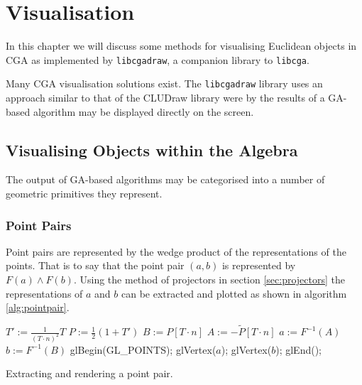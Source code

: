 \begin{savequote}
\end{savequote}

\chapter{Visualisation}

In this chapter we will discuss some methods for visualising Euclidean objects
in CGA as implemented by {\tt libcgadraw}, a companion library to {\tt libcga}.

Many CGA visualisation solutions exist\cite{CLU}. The {\tt libcgadraw} library
uses an approach similar to that of the CLUDraw library were by the results of 
a GA-based algorithm may be displayed directly on the screen.

\section{Visualising Objects within the Algebra}

The output of GA-based algorithms may be categorised into a number of
geometric primitives they represent.

\subsection{Point Pairs}

Point pairs are represented by the wedge product of the representations of the
points. That is to say that the point pair $(a,b)$ is represented by $F(a) \wedge F(b)$.
Using the method of projectors in section \ref{sec:projectors} the representations
of $a$ and $b$ can be extracted and plotted as shown in algorithm \ref{alg:pointpair}.

\begin{fancyalg}
\begin{algorithmic}[1]
\STATE $T' := \frac{1}{(T \cdot n)^2} T$
\STATE $P := \frac{1}{2}(1+T')$
\STATE $B := P \left[ T\cdot n \right]$
\STATE $A := - \tilde{P} \left[ T \cdot n \right]$
\STATE $a := F^{-1}(A)$
\STATE $b := F^{-1}(B)$
\STATE glBegin(GL\_POINTS);
\STATE glVertex($a$); glVertex($b$);
\STATE glEnd();
\end{algorithmic}
\caption{\label{alg:pointpair}Extracting and rendering a point pair.}
\end{fancyalg}

